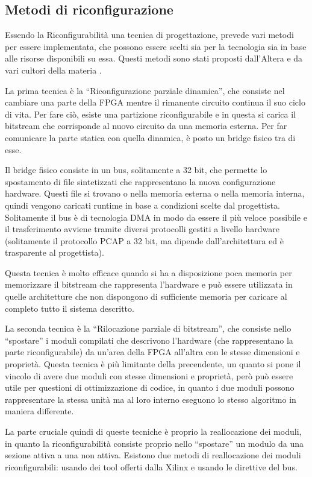 \documentclass[a4paper,titlepage]{book}
\begin{document}
\subsection{Metodi di riconfigurazione}

Essendo la Riconfigurabilità una tecnica di progettazione, prevede vari metodi per essere implementata, che possono essere scelti sia per la tecnologia sia in base alle risorse disponibili su essa. Questi metodi sono stati proposti dall'Altera \cite{PR1} e da vari cultori della materia \cite{PR2}.

La prima tecnica è la ``Riconfigurazione parziale dinamica'', che consiste nel cambiare una parte della FPGA mentre il rimanente circuito continua il suo ciclo di vita. Per fare ciò, esiste una partizione riconfigurabile e in questa si carica il bitstream che corrisponde al nuovo circuito da una memoria esterna. Per far comunicare la parte statica con quella dinamica, è posto un bridge fisico tra di esse.

Il bridge fisico consiste in un bus, solitamente a 32 bit, che permette lo spostamento di file sintetizzati che rappresentano la nuova configurazione hardware. Questi file si trovano o nella memoria esterna o nella memoria interna, quindi vengono caricati runtime in base a condizioni scelte dal progettista. Solitamente il bus è di tecnologia DMA in modo da essere il più veloce possibile e il trasferimento avviene tramite diversi protocolli gestiti a livello hardware (solitamente il protocollo PCAP a 32 bit, ma dipende dall'architettura ed è trasparente al progettista).

Questa tecnica è molto efficace quando si ha a disposizione poca memoria per memorizzare il bitstream che rappresenta l'hardware e può essere utilizzata in quelle architetture che non dispongono di sufficiente memoria per caricare al completo tutto il sistema descritto.


La seconda tecnica è la ``Rilocazione parziale di bitstream'', che consiste nello ``spostare'' i moduli compilati che descrivono l'hardware (che rappresentano la parte riconfigurabile) da un'area della FPGA all'altra con le stesse dimensioni e proprietà. Questa tecnica è più limitante della precendente, un quanto si pone il vincolo di avere due moduli con stesse dimensioni e proprietà, però può essere utile per questioni di ottimizzazione di codice, in quanto i due moduli possono rappresentare la stessa unità ma al loro interno eseguono lo stesso algoritmo in maniera differente.

La parte cruciale quindi di queste tecniche è proprio la reallocazione dei moduli, in quanto la riconfigurabilità consiste proprio nello ``spostare'' un modulo da una sezione attiva a una non attiva. Esistono due metodi di reallocazione dei moduli riconfigurabili: usando dei tool offerti dalla Xilinx e usando le direttive del bus.
\end{document}
